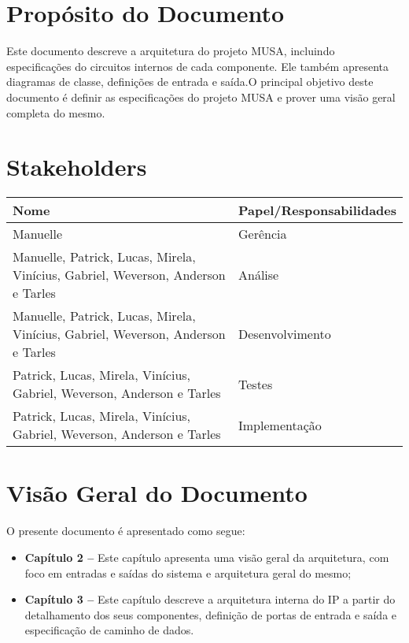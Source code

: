   \section{Propósito do Documento}
  Este documento descreve a arquitetura do projeto MUSA, incluindo especificações do circuitos internos de cada componente. Ele também apresenta diagramas de classe, definições de entrada e saída.O principal objetivo deste documento é definir as especificações do projeto MUSA e prover uma visão geral completa do mesmo.

  \section{Stakeholders}
    \FloatBarrier
    \begin{table}[H] 
      \begin{center}
        \begin{tabular}[pos]{|m{6cm} | m{8cm}|} 
          \hline 
          \cellcolor[gray]{0.9}\textbf{Nome} & \cellcolor[gray]{0.9}\textbf{Papel/Responsabilidades} \\  
           \hline Manuelle 	& Gerência \\
           \hline Manuelle, Patrick, Lucas, Mirela, Vinícius, Gabriel, Weverson, Anderson e Tarles 	& Análise \\
           \hline Manuelle, Patrick, Lucas, Mirela, Vinícius, Gabriel, Weverson, Anderson e Tarles 	& Desenvolvimento \\
           \hline Patrick, Lucas, Mirela, Vinícius, Gabriel, Weverson, Anderson e Tarles	& Testes       \\
           \hline Patrick, Lucas, Mirela, Vinícius, Gabriel, Weverson, Anderson e Tarles 	& Implementação \\ \hline
        \end{tabular}
      \end{center}
    \end{table} 

\section{Visão Geral do Documento}

O presente documento é apresentado como segue:

  \begin{itemize}
   \item \textbf{Capítulo 2 --} Este capítulo apresenta uma visão geral da arquitetura, com foco em entradas e saídas do sistema e arquitetura geral do mesmo;
   \item \textbf{Capítulo 3 --} Este capítulo descreve a arquitetura interna do IP a partir do detalhamento dos seus componentes, definição de portas de entrada e saída e especificação de caminho de dados.
  \end{itemize}


